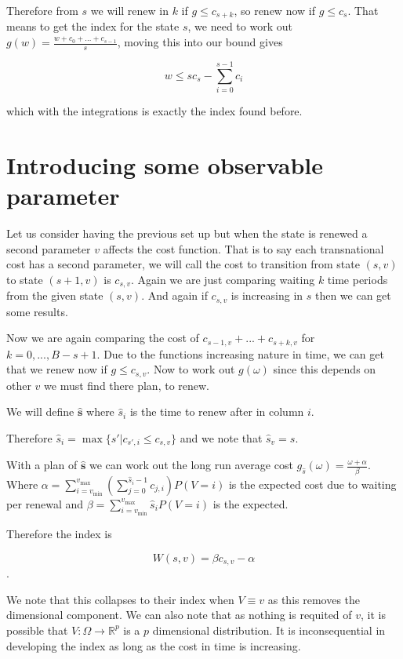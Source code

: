 \documentclass[a4paper,10pt]{article}
\theoremstyle{definition}
\theoremstyle{definition}
\theoremstyle{remark}
\theoremstyle{definition}
\begin{document}
Therefore from $s$ we will renew in $k$ if $g \leq c_{s+k}$, so renew now if $g \leq c_{s}$. That means to get the index for the state $s$, we need to work out $g(w)=\frac{w+c_{0}+...+c_{s-1}}{s}$, moving this into our bound gives

$$w \leq s c_{s} - \sum\limits_{i=0}^{s-1} c_{i}$$

which with the integrations is exactly the index found before.

\section{Introducing some observable parameter}
Let us consider having the previous set up but when the state is renewed a second parameter $v$ affects the cost function. That is to say each transnational cost has a second parameter, we will call the cost to transition from state $(s,v)$ to state $(s+1,v)$ is $c_{s,v}$. Again we are just comparing waiting $k$ time periods from the given state $(s,v)$. And again if $c_{s,v}$ is increasing in $s$ then we can get some results.


Now we are again comparing the cost of $c_{s-1,v}+...+c_{s+k,v}$ for $k=0,...,B-s+1$. Due to the functions increasing nature in time, we can  get that we renew now if $g \leq c_{s,v}$. Now to work out $g(\omega)$ since this depends on other $v$ we must find there plan, to renew.

We will define $\hat{\bm{s}}$ where $\hat{s}_{i}$ is the time to renew after in column $i$.

Therefore $\hat{s}_{i}=\max \{s' | c_{s',i} \leq c_{s,v}  \}$ and we note that $\hat{s}_{v}=s$.

With a plan of $\hat{\bm{s}}$ we can work out the long run average cost $g_{\hat{s}}(\omega)=\frac{\omega+\alpha}{\beta}$. Where $\alpha= \sum\limits_{i=v_{\text{min}}}^{v_{\text{max}}} (\sum\limits_{j=0}^{\hat{s}_{i}-1} c_{j,i}) P(V=i)$ is the expected cost due to waiting per renewal and $\beta=\sum\limits_{i=v_{\text{min}}}^{v_{\text{max}}} \hat{s}_{i} P(V=i) $ is the expected.

Therefore the index is

$$W(s,v)=\beta c_{s,v} - \alpha$$.

We note that this collapses to their index when $V \equiv v$ as this removes the dimensional component. We can also note that as nothing is requited of $v$, it is possible that $V: \Omega \rightarrow \mathbb{R}^{p}$ is a $p$ dimensional distribution. It is inconsequential in developing the index as long as the cost in time is increasing.
\end{document}
